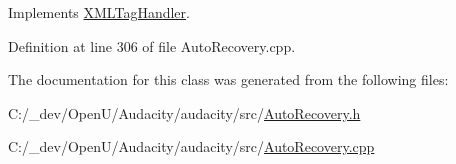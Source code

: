 Implements \hyperlink{class_x_m_l_tag_handler_aa1891aeb2d34e28a6ee0dd02391039b8}{X\+M\+L\+Tag\+Handler}.



Definition at line 306 of file Auto\+Recovery.\+cpp.



The documentation for this class was generated from the following files\+:\begin{DoxyCompactItemize}
\item 
C\+:/\+\_\+dev/\+Open\+U/\+Audacity/audacity/src/\hyperlink{_auto_recovery_8h}{Auto\+Recovery.\+h}\item 
C\+:/\+\_\+dev/\+Open\+U/\+Audacity/audacity/src/\hyperlink{_auto_recovery_8cpp}{Auto\+Recovery.\+cpp}\end{DoxyCompactItemize}

